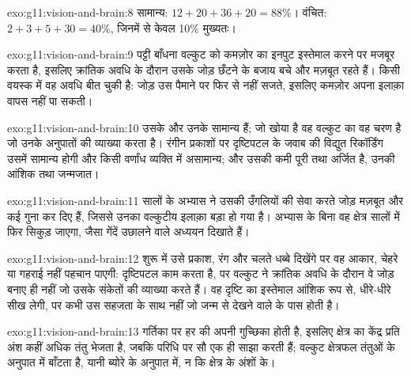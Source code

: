 \begin{solution}{exo:g11:vision-and-brain:8}
सामान्य: $12 + 20 + 36 + 20 = 88\%$। वंचित: $2 + 3 + 5 + 30 = 40\%$,
जिनमें से केवल 10\% मुख्यतः।
\end{solution}

\begin{solution}{exo:g11:vision-and-brain:9}
पट्टी बाँधना वल्कुट को कमज़ोर  का इनपुट इस्तेमाल करने पर मजबूर करता है,
इसलिए क्रांतिक अवधि के दौरान उसके जोड़ छँटने के बजाय बचे और मज़बूत रहते
हैं। किसी वयस्क में वह अवधि बीत चुकी है: जोड़ उस पैमाने पर फिर से नहीं सजते,
इसलिए कमज़ोर  अपना इलाक़ा वापस नहीं पा सकती।
\end{solution}

\begin{solution}{exo:g11:vision-and-brain:10}
उसके  और उनके  सामान्य हैं; जो खोया है वह वल्कुट का वह चरण है जो
उनके अनुपातों की व्याख्या करता है। रंगीन प्रकाशों पर दृष्टिपटल के जवाब की
विद्युत रिकॉर्डिंग उसमें सामान्य होगी और किसी वर्णांध व्यक्ति में असामान्य;
और उसकी कमी पूरी तथा अर्जित है, उनकी आंशिक तथा जन्मजात।
\end{solution}

\begin{solution}{exo:g11:vision-and-brain:11}
सालों के अभ्यास ने उसकी उँगलियों की सेवा करते जोड़ मज़बूत और कई गुना कर दिए
हैं, जिससे उनका वल्कुटीय इलाक़ा बड़ा हो गया है। अभ्यास के बिना वह क्षेत्र
सालों में फिर सिकुड़ जाएगा, जैसा गेंदें उछालने वाले अध्ययन दिखाते हैं।
\end{solution}

\begin{solution}{exo:g11:vision-and-brain:12}
शुरू में उसे प्रकाश, रंग और चलते धब्बे दिखेंगे पर वह आकार, चेहरे या गहराई
नहीं पहचान पाएगी: दृष्टिपटल काम करता है, पर वल्कुट ने क्रांतिक अवधि के
दौरान वे जोड़ बनाए ही नहीं जो उसके संकेतों की व्याख्या करते हैं। वह दृष्टि
का इस्तेमाल आंशिक रूप से, धीरे-धीरे सीख लेगी, पर कभी उस सहजता के साथ नहीं
जो जन्म से देखने वाले के पास होती है।
\end{solution}

\begin{solution}{exo:g11:vision-and-brain:13}
गर्तिका पर हर  की अपनी गुच्छिका  होती है, इसलिए क्षेत्र का केंद्र
प्रति अंश कहीं अधिक तंतु भेजता है, जबकि परिधि पर सौ  एक ही साझा करती
हैं; वल्कुट क्षेत्रफल तंतुओं के अनुपात में बाँटता है, यानी ब्योरे के अनुपात
में, न कि क्षेत्र के अंशों के।
\end{solution}

